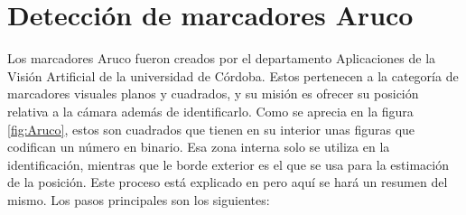 \section{Detección de marcadores Aruco} \label{sec:detectAruco}
	Los marcadores Aruco fueron creados por el departamento Aplicaciones de la Visión Artificial de la universidad de Córdoba. Estos pertenecen a la categoría de marcadores visuales planos y cuadrados, y su misión es ofrecer su posición relativa a la cámara además de identificarlo. 
	Como se aprecia en la figura \ref{fig:Aruco}, estos son cuadrados que tienen en su interior unas figuras que codifican un número en binario. Esa zona interna solo se utiliza en la identificación, mientras que le borde exterior es el que se usa para la estimación de la posición. Este proceso está explicado en \cite{aruco2014} pero aquí se hará un resumen del mismo. Los pasos principales son los siguientes:
\figAruco
